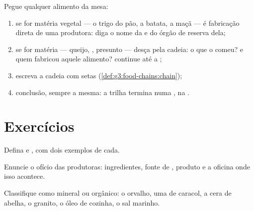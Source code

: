 \begin{method}\label{met:g6:plants-are-producers:trace}
Pegue qualquer alimento da mesa:
\begin{enumerate}
  \item se for matéria vegetal --- o trigo do pão, a batata, a maçã
        --- é fabricação direta de uma produtora: diga o nome da
         e do órgão de reserva dela;
  \item se for matéria  --- queijo, , presunto --- desça
        pela cadeia: o que o  comeu? e quem fabricou aquele
        alimento? continue até a ;
  \item escreva a cadeia com setas
        (\cref{def:g3:food-chains:chain});
  \item conclusão, sempre a mesma: a trilha termina numa , na
        .
\end{enumerate}
\end{method}

\section{Exercícios}

\begin{exercise}[$\star$]\label{exo:g6:plants-are-producers:1}
Defina  e , com dois exemplos de cada.
\end{exercise}

\begin{exercise}[$\star$]\label{exo:g6:plants-are-producers:2}
Enuncie o ofício das produtoras: ingredientes, fonte de ,
produto e a oficina onde isso acontece.
\end{exercise}

\begin{exercise}[$\star$]\label{exo:g6:plants-are-producers:3}
Classifique como mineral ou orgânico: o orvalho, uma  de
caracol, a cera de abelha, o granito, o óleo de cozinha, o sal
marinho.
\end{exercise}

